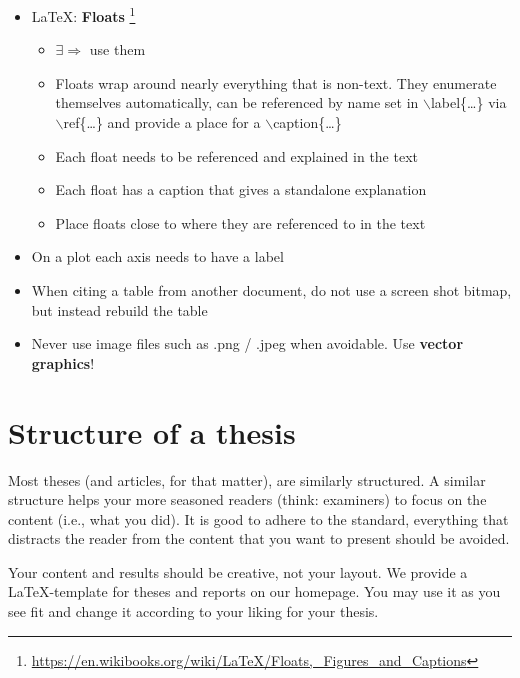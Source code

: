 \documentclass[nodate]{proc}
\begin{document}
\begin{itemize}
	\item \LaTeX: \textbf{Floats} \footnote{\href{https://en.wikibooks.org/wiki/LaTeX/Floats,_Figures_and_Captions}{https://en.wikibooks.org/wiki/LaTeX/Floats,\_Figures\_and\_Captions}}
	\begin{itemize}
		\item $\exists \Rightarrow$ use them
		\item Floats wrap around nearly everything that is non-text. They enumerate themselves automatically, can be referenced by name set in $\backslash$label\{\dots\} via $\backslash $ref\{\dots\} and provide a place for a $\backslash$caption\{\dots\}
		\item Each float needs to be referenced and explained in the text
		\item Each float has a caption that gives a standalone explanation
		\item Place floats close to where they are referenced to in the text
	\end{itemize}
	\item On a plot each axis needs to have a label
	\item When citing a table from another document, do not use a screen shot bitmap, but instead rebuild the table 
	\item Never use image files such as .png / .jpeg when avoidable. Use \textbf{vector graphics}!
\end{itemize}

\section{Structure of a thesis}

Most theses (and articles, for that matter), are similarly structured. 
A similar structure helps your more seasoned readers (think: examiners) to focus on the content (i.e., what you did). 
It is good to adhere to the standard, everything that distracts the reader from the content that you want to present should be avoided.

Your content and results should be creative, not your layout.
We provide a \LaTeX-template for theses and reports on our homepage.
You may use it as you see fit and change it according to your liking for your thesis.
\end{document}

